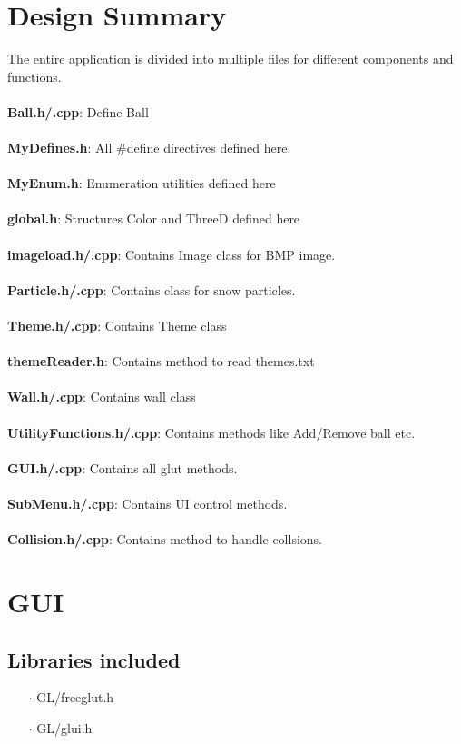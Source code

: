 \documentclass[a4paper,12pt]{report}
\begin{document}
\chapter{Design Summary}
The entire application is divided into multiple files for different components and functions.\\\\
\textbf{Ball.h/.cpp}: Define Ball \\\\
\textbf{MyDefines.h}: All \#define directives defined here.\\\\
\textbf{MyEnum.h}: Enumeration utilities defined here\\\\
\textbf{global.h}: Structures Color and ThreeD defined here\\\\ 
\textbf{imageload.h/.cpp}: Contains Image class for BMP image.\\\\
\textbf{Particle.h/.cpp}: Contains class for snow particles.\\\\
\textbf{Theme.h/.cpp}: Contains Theme class\\\\ 
\textbf{themeReader.h}: Contains method to read themes.txt\\\\
\textbf{Wall.h/.cpp}: Contains wall class\\\\ 
\textbf{UtilityFunctions.h/.cpp}: Contains methods like Add/Remove ball etc.\\\\
\textbf{GUI.h/.cpp}: Contains all glut methods.\\\\  
\textbf{SubMenu.h/.cpp}: Contains UI control methods.\\\\    
\textbf{Collision.h/.cpp}: Contains method to handle collsions.
\chapter{GUI}
\section{Libraries included}
\begin{itemize}
\item[$\cdot$] GL/freeglut.h
\item[$\cdot$] GL/glui.h
\end{itemize}
\end{document}
